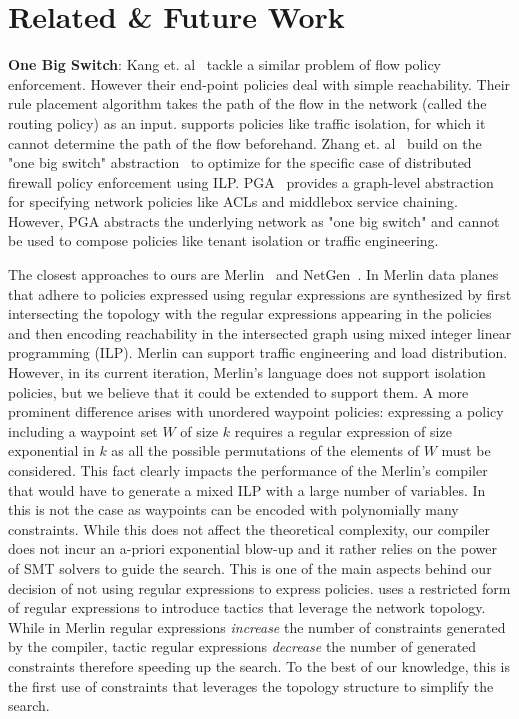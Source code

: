 \section{Related \& Future Work} \label{sec:relatedwork}
\textbf{One Big Switch}: Kang et. al~\cite{oneswitch} tackle a 
similar problem of flow policy
enforcement. However their end-point policies deal with simple
reachability. Their rule placement algorithm takes the path of the
flow in the network  (called the routing policy) as an input. %
\Name supports policies like traffic isolation, 
for which it cannot determine the path of the flow
beforehand. %
Zhang et. al~\cite{distfirewall} build on the "one big switch"  
abstraction~\cite{oneswitch} to optimize for the specific case of
distributed firewall policy enforcement using ILP.  PGA~\cite{pga} provides
a graph-level abstraction for specifying network policies like ACLs and
middlebox service chaining. However, PGA abstracts the underlying
network as "one big switch" and cannot be used to compose policies like
tenant isolation or traffic engineering.

The closest approaches to ours are Merlin~\cite{merlin} and
NetGen~\cite{netgen}.  In Merlin data planes that adhere to policies
expressed using regular expressions are synthesized by first
intersecting the topology with the regular expressions appearing in
the policies and then encoding reachability in the intersected graph
using mixed integer linear programming (ILP).
Merlin can support traffic engineering and load distribution. 
However, in its current iteration, 
Merlin's language does not support isolation policies, but we believe
that it could be extended to support them.  
A more prominent
difference arises with unordered waypoint policies: expressing a
policy including a waypoint set $W$ of size $k$ requires a regular
expression of size exponential in $k$ as all the possible permutations
of the elements of $W$ must be considered. This fact clearly impacts the performance of
the Merlin's compiler that would have to generate a mixed ILP with a
large number of variables.  In \Name this is not the case as waypoints
can be encoded with polynomially many constraints.  While this does
not affect the theoretical complexity, our compiler does not incur
an a-priori exponential blow-up and it rather relies on the power
of SMT solvers to guide the search.  This is one of the main aspects
behind our decision of not using regular expressions to express
policies.  \Name uses a restricted form of regular expressions to
introduce tactics that leverage the network topology.  While in Merlin
regular expressions \emph{increase} the number of constraints
generated by the compiler, tactic regular expressions \emph{decrease}
the number of generated constraints therefore speeding up the search.
To the best of our knowledge, this is the first use of constraints
that leverages the topology structure to simplify the search.

